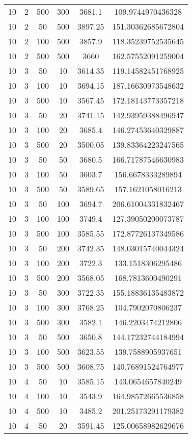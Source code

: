 {\begin{longtabu}{S
S
S
S
S[round-mode=places, round-precision=0]
S[round-mode=places, round-precision=0]}
10 & 2 & 500 & 300 & 3681.1 & 109.9744970436328 \\
10 & 2 & 50 & 500 & 3897.25 & 151.30362685672804 \\
10 & 2 & 100 & 500 & 3857.9 & 118.35239752535645 \\
10 & 2 & 500 & 500 & 3660 & 162.57552091259004 \\
10 & 3 & 50 & 10 & 3614.35 & 119.14582451768925 \\
10 & 3 & 100 & 10 & 3694.15 & 187.16630973548632 \\
10 & 3 & 500 & 10 & 3567.45 & 172.18143773357218 \\
10 & 3 & 50 & 20 & 3741.15 & 142.93959388496947 \\
10 & 3 & 100 & 20 & 3685.4 & 146.27453640329887 \\
10 & 3 & 500 & 20 & 3500.05 & 139.83364223247565 \\
10 & 3 & 50 & 50 & 3680.5 & 166.71787546630983 \\
10 & 3 & 100 & 50 & 3603.7 & 156.6678333289894 \\
10 & 3 & 500 & 50 & 3589.65 & 157.1621058016213 \\
10 & 3 & 50 & 100 & 3694.7 & 206.61004331832467 \\
10 & 3 & 100 & 100 & 3749.4 & 127.39050200073787 \\
10 & 3 & 500 & 100 & 3585.55 & 172.87726137349586 \\
10 & 3 & 50 & 200 & 3742.35 & 148.03015740044324 \\
10 & 3 & 100 & 200 & 3722.3 & 133.1518306295486 \\
10 & 3 & 500 & 200 & 3568.05 & 168.7813600490291 \\
10 & 3 & 50 & 300 & 3722.35 & 155.18836135483872 \\
10 & 3 & 100 & 300 & 3768.25 & 104.7902070806237 \\
10 & 3 & 500 & 300 & 3582.1 & 146.2203474212806 \\
10 & 3 & 50 & 500 & 3650.8 & 144.17232744184994 \\
10 & 3 & 100 & 500 & 3623.55 & 139.7588905937651 \\
10 & 3 & 500 & 500 & 3608.75 & 140.76891524764977 \\
10 & 4 & 50 & 10 & 3585.15 & 143.0654657840249 \\
10 & 4 & 100 & 10 & 3543.9 & 164.98572665536858 \\
10 & 4 & 500 & 10 & 3485.2 & 201.25173291179382 \\
10 & 4 & 50 & 20 & 3591.45 & 125.00658982629676 \\

\end{longtabu}}
